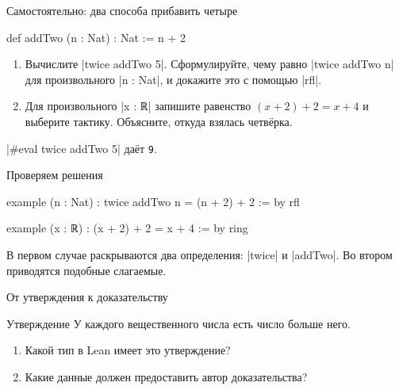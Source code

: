 \documentclass[aspectratio=169]{beamer}
\begin{document}
\begin{frame}[fragile]{Самостоятельно: два способа прибавить четыре}
\begin{lean}
def addTwo (n : Nat) : Nat := n + 2
\end{lean}
\begin{enumerate}
\item Вычислите \leaninline|twice addTwo 5|. Сформулируйте, чему равно \leaninline|twice addTwo n| для произвольного \leaninline|n : Nat|, и докажите это с помощью \leaninline|rfl|.
\item Для произвольного \leaninline|x : ℝ| запишите равенство \((x+2)+2=x+4\) и выберите тактику. Объясните, откуда взялась четвёрка.
\end{enumerate}
\pause
\leaninline|#eval twice addTwo 5| даёт \texttt{9}.
\end{frame}

\begin{frame}[fragile]{Проверяем решения}
\begin{lean}
example (n : Nat) :
    twice addTwo n = (n + 2) + 2 := by
  rfl

example (x : ℝ) : (x + 2) + 2 = x + 4 := by
  ring
\end{lean}
В первом случае раскрываются два определения: \leaninline|twice| и \leaninline|addTwo|. Во втором приводятся подобные слагаемые.
\end{frame}

\begin{frame}{От утверждения к доказательству}
\begin{block}{Утверждение}
У каждого вещественного числа есть число больше него.
\end{block}

\begin{enumerate}
\item Какой тип в Lean имеет это утверждение?
\item Какие данные должен предоставить автор доказательства?
\end{enumerate}
\end{frame}
\end{document}

